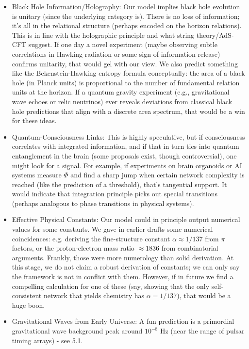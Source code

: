 \documentclass{article}
\begin{document}
\begin{itemize}
\item Black Hole Information/Holography: Our model implies black hole evolution is unitary (since the underlying category is). There is no loss of information; it's all in the relational structure (perhaps encoded on the horizon relations). This is in line with the holographic principle and what string theory/AdS-CFT suggest. If one day a novel experiment (maybe observing subtle correlations in Hawking radiation or some sign of information release) confirms unitarity, that would gel with our view. We also predict something like the Bekenstein-Hawking entropy formula conceptually: the area of a black hole (in Planck units) is proportional to the number of fundamental relation units at the horizon. If a quantum gravity experiment (e.g., gravitational wave echoes or relic neutrinos) ever reveals deviations from classical black hole predictions that align with a discrete area spectrum, that would be a win for these ideas.
\item Quantum-Consciousness Links: This is highly speculative, but if consciousness correlates with integrated information, and if that in turn ties into quantum entanglement in the brain (some proposals exist, though controversial), one might look for a signal. For example, if experiments on brain organoids or AI systems measure $\Phi$ and find a sharp jump when certain network complexity is reached (like the prediction of a threshold\cite{oizumi2014}), that’s tangential support. It would indicate that integration principle picks out special transitions (perhaps analogous to phase transitions in physical systems).
\item Effective Physical Constants: Our model could in principle output numerical values for some constants. We gave in earlier drafts some numerical coincidences: e.g. deriving the fine-structure constant $\alpha \approx 1/137$ from $\pi$ factors, or the proton-electron mass ratio $\approx 1836$ from combinatorial arguments. Frankly, those were more numerology than solid derivation. At this stage, we do not claim a robust derivation of constants; we can only say the framework is not in conflict with them. However, if in future we find a compelling calculation for one of these (say, showing that the only self-consistent network that yields chemistry has $\alpha = 1/137$), that would be a huge boon.
\item Gravitational Waves from Early Universe: A fun prediction is a primordial gravitational wave background peak around $10^{-8}$ Hz (near the range of pulsar timing arrays) - see 5.1.

\end{itemize}
\end{document}
